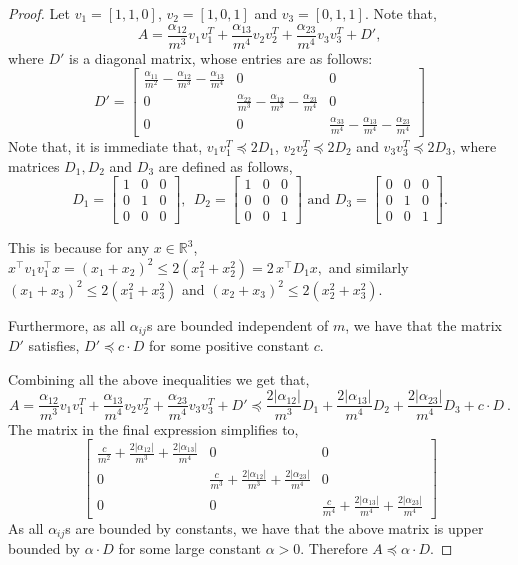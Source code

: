\documentclass[10pt]{article} %
\theoremstyle{plain}
\begin{document}
\begin{proof}
	Let $v_1=[1,1,0]$, $v_2=[1,0,1]$ and $v_3=[0,1,1]$.
	Note that, 
	$$A=\frac{\alpha_{12}}{m^3} v_1 v_1^T+\frac{\alpha_{13}}{m^4} v_2 v_2^T + \frac{\alpha_{23}}{m^4} v_3 v_3^T + D',$$
	where $D'$ is a diagonal matrix, whose entries are as follows:
	\begin{equation}
		D'=\begin{bmatrix}
			\frac{\alpha_{11}}{m^2}-\frac{\alpha_{12}}{m^3}-\frac{\alpha_{13}}{m^4}& 0 & 0\\
			0 &\frac{\alpha_{22}}{m^3} -\frac{\alpha_{12}}{ m^3}-\frac{\alpha_{23}}{m^4}& 0 \\
			0 & 0 & \frac{\alpha_{33}}{m^4}-\frac{\alpha_{13}}{ m^4}-\frac{\alpha_{23}}{ m^4}
		\end{bmatrix}    
	\end{equation}
	Note that, it is immediate that, $v_1v_1^T \preceq 2 D_1$,  $v_2v_2^T \preceq 2 D_2$ and $v_3v_3^T \preceq 2 D_3$, where matrices $D_1, D_2$ and $D_3$ are defined as follows,
	$$D_1=\begin{bmatrix}
		1 & 0 & 0\\
		0 & 1 & 0 \\
		0 & 0 & 0
	\end{bmatrix},~~D_2=\begin{bmatrix}
		1 & 0 & 0\\
		0 & 0 & 0 \\
		0 & 0 & 1
	\end{bmatrix} \text{ and }D_3=\begin{bmatrix}
		0 & 0 & 0\\
		0 & 1 & 0 \\
		0 & 0 & 1
	\end{bmatrix}. $$

This is because for any $x\in\mathbb{R}^3$,
$x^\top v_1v_1^\top x=(x_1+x_2)^2\le 2(x_1^2+x_2^2)=2\,x^\top D_1 x,
$
and similarly $(x_1+x_3)^2\le 2(x_1^2+x_3^2)$ and $(x_2+x_3)^2\le 2(x_2^2+x_3^2)$.

    
	Furthermore, as all $\alpha_{ij}$s are bounded independent of $m$, we have that the matrix $D'$ satisfies, $D' \preceq c \cdot D$ for some positive constant $c$.
	
	Combining all the above inequalities we get that,
	$$A = \frac{\alpha_{12}}{m^3} v_1 v_1^T+\frac{\alpha_{13}}{m^4} v_2 v_2^T + \frac{\alpha_{23}}{m^4} v_3 v_3^T + D' \preceq \frac{2|\alpha_{12}|}{m^3} D_1+\frac{2|\alpha_{13}|}{m^4} D_2 + \frac{2|\alpha_{23}|}{m^4} D_3 + c \cdot D~.$$
	The matrix in the final expression simplifies to,
	$$\begin{bmatrix}
		\frac{c}{m^2}+\frac{2|\alpha_{12}|}{m^3}+\frac{2|\alpha_{13}|}{m^4}  & 0 & 0\\
		0 &\frac{c}{m^3} +\frac{2|\alpha_{12}|}{ m^3}+\frac{2|\alpha_{23}|}{m^4}& 0 \\
		0 & 0 & \frac{c}{m^4}+\frac{2|\alpha_{13}|}{ m^4}+\frac{2|\alpha_{23}|}{ m^4}
	\end{bmatrix}$$
	As all $\alpha_{ij}$s are bounded by constants, we have that the above matrix is upper bounded by $\alpha \cdot D$ for some large constant $\alpha>0$. Therefore $A \preceq \alpha \cdot D$.
	

\end{proof}
\end{document}
